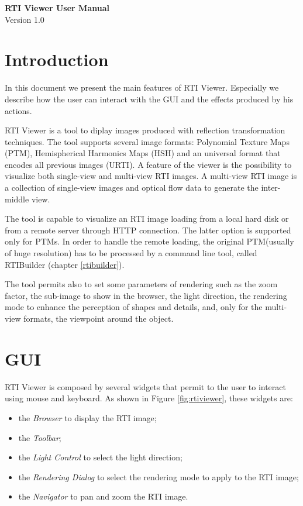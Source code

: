 \documentclass[oneside, 11pt]{book}
\begin{document}
\begin{titlepage}
\vspace*{0.5\textwidth}
\begin{center}
{\Huge \textbf{RTI Viewer User Manual}}
\\
\vspace{1.0cm}
Version 1.0
\end{center}

\end{titlepage}

\tableofcontents

\chapter{Introduction}
In this document we present the main features of RTI Viewer. Especially we describe how the user can interact with the GUI and the effects produced by his actions.

RTI Viewer is a tool to diplay images produced with reflection transformation techniques. The tool supports several image formats: Polynomial Texture Maps (PTM), Hemispherical Harmonics Maps (HSH) and an universal format that encodes all previous images (URTI). A feature of the viewer is the possibility to visualize both single-view and multi-view RTI images. A multi-view RTI image is a collection of single-view images and optical flow data to generate the inter-middle view.

The tool is capable to visualize an RTI image loading from a local hard disk or from a remote server through HTTP connection. The latter option is supported only for PTMs. In order to handle the remote loading, the original PTM(usually of huge resolution) has to be processed by a command line tool, called RTIBuilder (chapter \ref{rtibuilder}).

The tool permits also to set some parameters of rendering such as the zoom factor, the sub-image to show in the browser, the light direction, the rendering mode to enhance the perception of shapes and details, and, only for the multi-view formats, the viewpoint around the object.

\chapter{GUI}
RTI Viewer is composed by several widgets that permit to the user to interact using mouse and keyboard. As shown in Figure \ref{fig:rtiviewer}, these widgets are:
\begin{itemize}
\item the \emph{Browser} to display the RTI image;
\item the \emph{Toolbar};
\item the \emph{Light Control} to select the light direction;
\item the \emph{Rendering Dialog} to select the rendering mode to apply to the RTI image;
\item the \emph{Navigator} to pan and zoom the RTI image.
\end{itemize}
\end{document}
